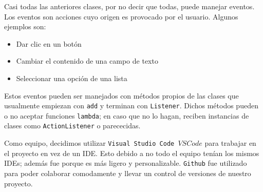   Casi todas las anteriores clases, por no decir que todas, puede manejar eventos. Los eventos son acciones cuyo origen es provocado
  por el usuario. Algunos ejemplos son:

  \begin{itemize}
      \item Dar clic en un botón
      \item Cambiar el contenido de una campo de texto
      \item Seleccionar una opción de una lista
  \end{itemize}

  Estos eventos pueden ser manejados con métodos propios de las clases que usualmente empiezan con \texttt{add} y terminan con
  \texttt{Listener}. Dichos métodos pueden o no aceptar funciones \texttt{lambda}; en caso que no lo hagan, reciben instancias de clases
  como \texttt{ActionListener} o parececidas.

  Como equipo, decidimos utilizar \texttt{Visual Studio Code \(VS Code\)} para trabajar en el proyecto en vez de un IDE. Esto debido a no todo
  el equipo tenían los mismos IDEs; además fue porque es más ligero y personalizable. \texttt{Github} fue utilizado para poder colaborar
  comodamente y llevar un control de versiones de nuestro proyecto.